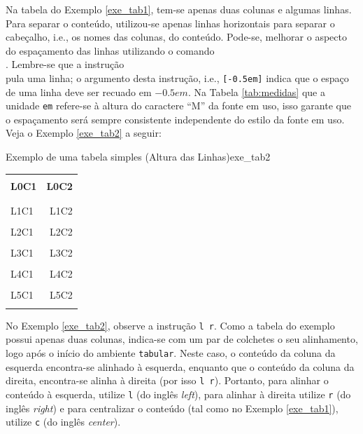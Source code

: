 Na tabela do Exemplo \ref{exe_tab1}, tem-se apenas duas colunas e algumas linhas. Para separar o conteúdo, utilizou-se apenas linhas horizontais para separar o cabeçalho, i.e., os nomes das colunas, do conteúdo. Pode-se, melhorar o aspecto do espaçamento das linhas utilizando o comando \texttt{\\[-0.5em]}. Lembre-se que a instrução \texttt{\\} pula uma linha; o argumento desta instrução, i.e., \texttt{[-0.5em]} indica que o espaço de uma linha deve ser recuado em $-0.5em$. Na Tabela \ref{tab:medidas} que a unidade {\tt em} refere-se à altura do caractere ``M'' da fonte em uso, isso garante que o espaçamento será sempre consistente independente do estilo da fonte em uso. Veja o Exemplo \ref{exe_tab2} a seguir:

\begin{texexptitled}[breakable,center lower,enhanced,middle=2mm]{Exemplo de uma tabela simples (Altura das Linhas)}{exe_tab2}
\begin{tabular}{l r}
\hline 
\\[-0.5em]
\textbf{L0C1} & \textbf{L0C2} \\
\\[-0.5em]
\hline
\\[-0.5em]
L1C1 & L1C2 \\
\\[-0.5em]
L2C1 & L2C2 \\
\\[-0.5em]
L3C1 & L3C2 \\
\\[-0.5em]
L4C1 & L4C2 \\
\\[-0.5em]
L5C1 & L5C2 \\
\\[-0.5em]
\hline
\end{tabular}
\end{texexptitled}

No Exemplo \ref{exe_tab2}, observe a instrução \texttt{{l r}}. Como a tabela do exemplo possui apenas duas colunas, indica-se com um par de colchetes o seu alinhamento, logo após o início do ambiente {\tt tabular}. Neste caso, o conteúdo da coluna da esquerda encontra-se alinhado à esquerda, enquanto que o conteúdo da coluna da direita, encontra-se alinha à direita (por isso {\tt l r}). Portanto, para alinhar o conteúdo à esquerda, utilize {\tt l} (do inglês \textit{left}), para alinhar à direita utilize {\tt r} (do inglês \textit{right}) e para centralizar o conteúdo (tal como no Exemplo \ref{exe_tab1}), utilize {\tt c} (do inglês \textit{center}).

